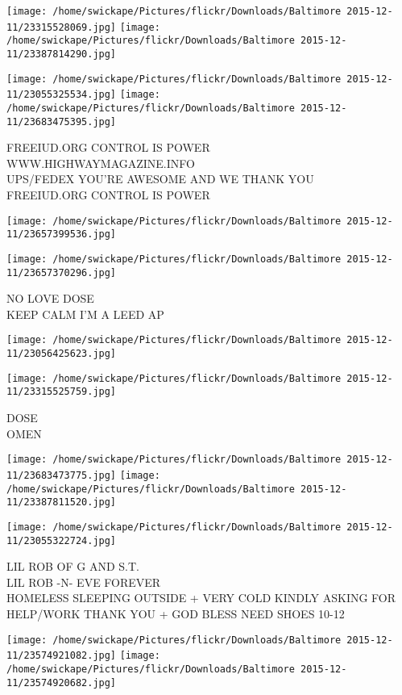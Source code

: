 \documentclass[10pt,letterpaper]{article}
\begin{document}
\texttt{[image: /home/swickape/Pictures/flickr/Downloads/Baltimore 2015-12-11/23315528069.jpg]}
\texttt{[image: /home/swickape/Pictures/flickr/Downloads/Baltimore 2015-12-11/23387814290.jpg]}

\texttt{[image: /home/swickape/Pictures/flickr/Downloads/Baltimore 2015-12-11/23055325534.jpg]}
\texttt{[image: /home/swickape/Pictures/flickr/Downloads/Baltimore 2015-12-11/23683475395.jpg]}

FREEIUD.ORG CONTROL IS POWER\\
WWW.HIGHWAYMAGAZINE.INFO\\
UPS/FEDEX YOU'RE AWESOME AND WE THANK YOU\\
FREEIUD.ORG CONTROL IS POWER
\pagebreak

\texttt{[image: /home/swickape/Pictures/flickr/Downloads/Baltimore 2015-12-11/23657399536.jpg]}

\vspace{0.25in}
\texttt{[image: /home/swickape/Pictures/flickr/Downloads/Baltimore 2015-12-11/23657370296.jpg]}

NO LOVE DOSE\\
KEEP CALM I'M A LEED AP
\pagebreak

\texttt{[image: /home/swickape/Pictures/flickr/Downloads/Baltimore 2015-12-11/23056425623.jpg]}

\vspace{0.25in}
\texttt{[image: /home/swickape/Pictures/flickr/Downloads/Baltimore 2015-12-11/23315525759.jpg]}

DOSE\\
OMEN
\pagebreak

\texttt{[image: /home/swickape/Pictures/flickr/Downloads/Baltimore 2015-12-11/23683473775.jpg]}
\texttt{[image: /home/swickape/Pictures/flickr/Downloads/Baltimore 2015-12-11/23387811520.jpg]}

\vspace{0.25in}
\texttt{[image: /home/swickape/Pictures/flickr/Downloads/Baltimore 2015-12-11/23055322724.jpg]}

LIL ROB OF G AND S.T.\\
LIL ROB {-}N{-} EVE FOREVER\\
HOMELESS SLEEPING OUTSIDE + VERY COLD KINDLY ASKING FOR HELP/WORK THANK YOU + GOD BLESS NEED SHOES 10{-}12
\pagebreak

\texttt{[image: /home/swickape/Pictures/flickr/Downloads/Baltimore 2015-12-11/23574921082.jpg]}
\texttt{[image: /home/swickape/Pictures/flickr/Downloads/Baltimore 2015-12-11/23574920682.jpg]}
\end{document}
